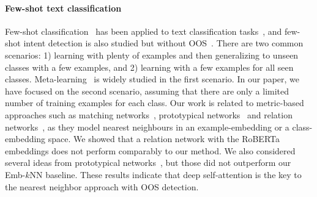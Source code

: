 \paragraph{Few-shot text classification}
Few-shot classification~\citep{fei2006one,vinyals2016matching} has been applied to text classification tasks~\citep{deng2019low,geng2019induction,xu2019open}, and few-shot intent detection is also studied but without OOS~\citep{marrying-reg,xia2020cg,efficient_intent}.
There are two common scenarios: 1) learning with plenty of examples and then generalizing to unseen classes with a few examples, and 2) learning with a few examples for all seen classes.
Meta-learning~\citep{finn2017model,geng2019induction} is widely studied in the first scenario.
In our paper, we have focused on the second scenario, assuming that there are only a limited number of training examples for each class.
Our work is related to metric-based approaches such as matching networks~\cite{matching-net}, prototypical networks~\cite{proto-net} and relation networks~\cite{relation_net}, as they model nearest neighbours in an example-embedding or a class-embedding space.
We showed that a relation network with the RoBERTa embeddings does not perform comparably to our method.
We also considered several ideas from prototypical networks~\citep{hierarchical-proto-net}, but those did not outperform our Emb-$k$NN baseline.
These results indicate that deep self-attention is the key to the nearest neighbor approach with OOS detection.

